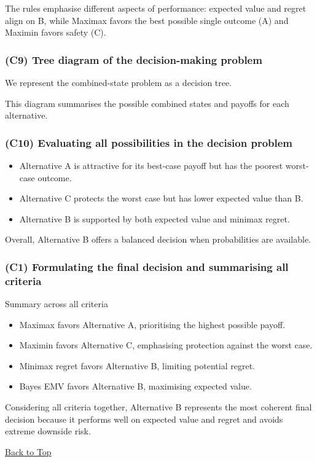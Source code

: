 The rules emphasise different aspects of performance: expected value and regret align on B, while Maximax favors the best possible single outcome (A) and Maximin favors safety (C).

\subsubsection{(C9) Tree diagram of the decision-making problem}\label{subsubsec:example2-1-c9}

We represent the combined-state problem as a decision tree.

This diagram summarises the possible combined states and payoffs for each alternative.

\subsubsection{(C10) Evaluating all possibilities in the decision problem}\label{subsubsec:example2-1-c10}

\begin{itemize}
	\item Alternative A is attractive for its best-case payoff but has the poorest worst-case outcome.
	\item Alternative C protects the worst case but has lower expected value than B.
	\item Alternative B is supported by both expected value and minimax regret.
\end{itemize}

Overall, Alternative B offers a balanced decision when probabilities are available.

\subsubsection{(C1) Formulating the final decision and summarising all criteria}\label{subsubsec:example2-1-c1}

Summary across all criteria

\begin{itemize}
	\item Maximax favors Alternative A, prioritising the highest possible payoff.
	\item Maximin favors Alternative C, emphasising protection against the worst case.
	\item Minimax regret favors Alternative B, limiting potential regret.
	\item Bayes EMV favors Alternative B, maximising expected value.
\end{itemize}

Considering all criteria together, Alternative B represents the most coherent final decision because it performs well on expected value and regret and avoids extreme downside risk.

\vspace{6pt}
\noindent\hyperref[table-of-contents]{Back to Top}
